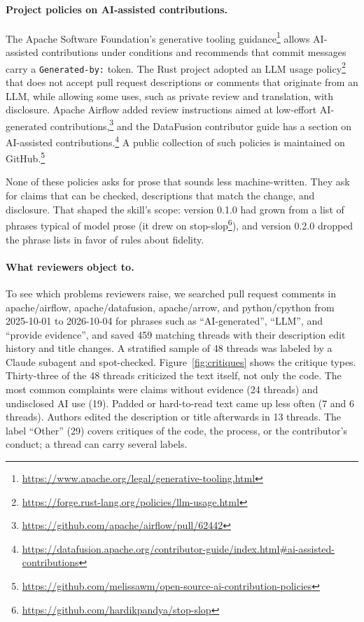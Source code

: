 \documentclass[11pt]{article}
\newcommand{\code}[1]{\texttt{#1}}
\begin{document}
\paragraph{Project policies on AI-assisted contributions.} The Apache Software
Foundation's generative tooling guidance\footnote{\url{https://www.apache.org/legal/generative-tooling.html}}
allows AI-assisted contributions under conditions and recommends that commit messages
carry a \code{Generated-by:} token. The Rust project adopted an LLM usage
policy\footnote{\url{https://forge.rust-lang.org/policies/llm-usage.html}} that does not
accept pull request descriptions or comments that originate from an LLM, while allowing
some uses, such as private review and translation, with disclosure. Apache Airflow added
review instructions aimed at low-effort AI-generated
contributions,\footnote{\url{https://github.com/apache/airflow/pull/62442}} and the
DataFusion contributor guide has a section on AI-assisted
contributions.\footnote{\url{https://datafusion.apache.org/contributor-guide/index.html\#ai-assisted-contributions}}
A public collection of such policies is maintained on
GitHub.\footnote{\url{https://github.com/melissawm/open-source-ai-contribution-policies}}

None of these policies asks for prose that sounds less machine-written. They ask for
claims that can be checked, descriptions that match the change, and disclosure. That
shaped the skill's scope: version 0.1.0 had grown from a list of phrases typical of model
prose (it drew on stop-slop\footnote{\url{https://github.com/hardikpandya/stop-slop}}),
and version 0.2.0 dropped the phrase lists in favor of rules about fidelity.

\paragraph{What reviewers object to.} To see which problems reviewers raise, we searched
pull request comments in apache/airflow, apache/datafusion, apache/arrow, and
python/cpython from 2025-10-01 to 2026-10-04 for phrases such as ``AI-generated'',
``LLM'', and ``provide evidence'', and saved 459 matching threads with their description
edit history and title changes. A stratified sample of 48 threads was labeled by a Claude
subagent and spot-checked. Figure~\ref{fig:critiques} shows the critique types.
Thirty-three of the 48 threads criticized the text itself, not only the code. The most
common complaints were claims without evidence (24 threads) and undisclosed AI use (19).
Padded or hard-to-read text came up less often (7 and 6 threads). Authors edited the
description or title afterwards in 13 threads. The label ``Other'' (29) covers critiques
of the code, the process, or the contributor's conduct; a thread can carry several labels.
\end{document}
